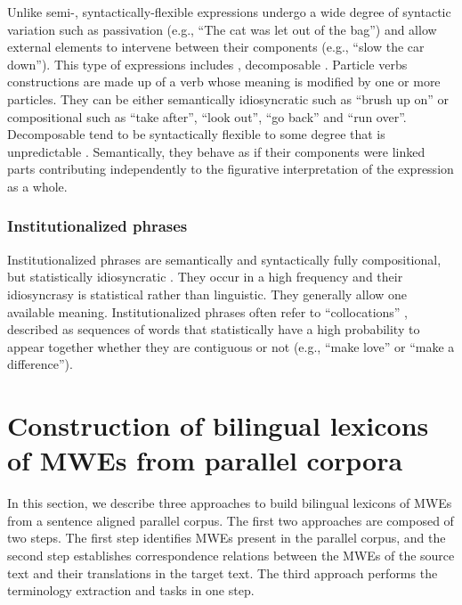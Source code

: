 \documentclass[output=paper,modfonts,nonflat]{langsci/langscibook}
\begin{document}
Unlike semi-, syntactically-flexible expressions undergo a wide degree of syntactic variation such as passivation (e.g., ``The cat was let out of the bag'') and allow external elements to intervene between their components (e.g., ``slow the car down''). This type of expressions includes , decomposable . 
Particle verbs constructions are made up of a verb whose meaning is modified by one or more particles. They can be either semantically idiosyncratic such as ``brush up on''  or compositional such as ``take after'', ``look out'', ``go back'' and ``run over''.
Decomposable  tend to be syntactically flexible to some degree that is unpredictable \citep{riehemann01}. Semantically, they behave as if their components were linked parts contributing independently to the figurative interpretation of the expression as a whole.

\subsubsection{Institutionalized phrases}
Institutionalized phrases are semantically and syntactically fully compositional, but statistically idiosyncratic \citep{sag02}. They occur in a high frequency and their idiosyncrasy is statistical rather than linguistic. They generally allow one available meaning. Institutionalized phrases often refer to “collocations” \citep{barz1996komposition,riehemann01,burger2010phraseologie}, described as sequences of words that statistically have a high probability to appear together whether they are contiguous or not (e.g., ``make love'' or ``make a difference'').

\section{Construction of bilingual lexicons of MWEs from parallel corpora}


In this section, we describe three approaches to build bilingual lexicons of MWEs from a
sentence aligned parallel corpus. The first two approaches are composed of two steps. The first step identifies MWEs present in the parallel corpus, and the second step establishes correspondence relations between the MWEs of the source text and their translations in the target text. The third approach performs the terminology extraction and  tasks in one step. 
\end{document}
